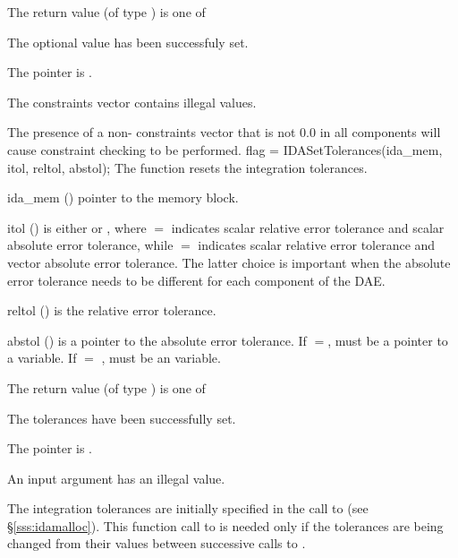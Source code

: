 {{\begin{args}
  \end{args}
}
{
  The return value  (of type ) is one of
  \begin{args}
  \item[\Id{IDA\_SUCCESS}] 
    The optional value has been successfuly set.
  \item[\Id{IDA\_MEM\_NULL}]
    The  pointer is .
  \item[\Id{IDA\_ILL\_INPUT}]
    The constraints vector contains illegal values.
  \end{args}
}
{
  The presence of a non- constraints vector that is not $0.0$ in
  all components will cause constraint checking to be performed.
}
{
flag = IDASetTolerances(ida\_mem, itol, reltol, abstol);
}
{
  The function  resets the integration tolerances.
}
{
  \begin{args}
  \item[ida\_mem] ()
    pointer to the {\ida} memory block.
  \item[itol] () 
    is either  or , where $=$ indicates
    scalar relative error tolerance and scalar absolute error tolerance, while
    $=$ indicates scalar relative error tolerance and vector
    absolute error tolerance.  The latter choice is important when the absolute
    error tolerance needs to be different for each component of the DAE. 
  \item[reltol] ()
    is the relative error tolerance.
  \item[abstol] ()
    is a pointer to the absolute error tolerance. If $=$,
     must be a pointer to a  variable. If
     $ = $ ,  must be an  variable.
  \end{args}
}
{
  The return value  (of type ) is one of
  \begin{args}
  \item[\Id{IDA\_SUCCESS}] 
    The tolerances have been successfully set.
  \item[\Id{IDA\_MEM\_NULL}]
    The  pointer is .
  \item[\Id{IDA\_ILL\_INPUT}]
    An input argument has an illegal value.
  \end{args}
}
{
  The integration tolerances are initially specified in the call
  to  (see \S\ref{sss:idamalloc}). This function call
  to  is needed only if the tolerances are being changed
  from their values between successive calls to .

}}
